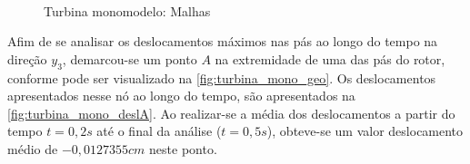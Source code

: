 \begin{figure}[!htbp]
	\caption{Turbina monomodelo: Malhas}
	\centering 
	 \ \
	\label{fig:turbina_mono_malha}
\end{figure}

Afim de se analisar os deslocamentos máximos nas pás ao longo do tempo na direção $y_3$, demarcou-se um ponto $A$ na extremidade de uma das pás do rotor, conforme pode ser visualizado na \autoref{fig:turbina_mono_geo}. Os deslocamentos apresentados nesse nó ao longo do tempo, são apresentados na \autoref{fig:turbina_mono_deslA}. Ao realizar-se a média dos deslocamentos a partir do tempo $t=0,2s$ até o final da análise ($t=0,5s$), obteve-se um valor deslocamento médio de $-0,0127355cm$ neste ponto. 


